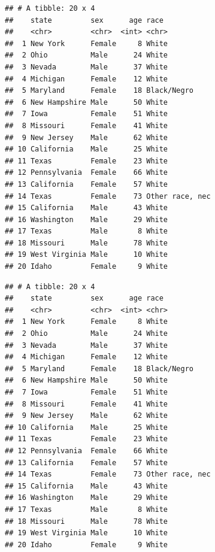 \documentclass[]{book}
\newenvironment{Shaded}{\begin{snugshade}}{\end{snugshade}}
\newcommand{\DecValTok}[1]{\textcolor[rgb]{0.00,0.00,0.81}{#1}}
\newcommand{\KeywordTok}[1]{\textcolor[rgb]{0.13,0.29,0.53}{\textbf{#1}}}
\newcommand{\NormalTok}[1]{#1}
\newcommand{\OperatorTok}[1]{\textcolor[rgb]{0.81,0.36,0.00}{\textbf{#1}}}
\newcommand{\StringTok}[1]{\textcolor[rgb]{0.31,0.60,0.02}{#1}}
\theoremstyle{definition}
\theoremstyle{definition}
\theoremstyle{definition}
\theoremstyle{remark}
\begin{document}
\begin{verbatim}
## # A tibble: 20 x 4
##    state         sex      age race           
##    <chr>         <chr>  <int> <chr>          
##  1 New York      Female     8 White          
##  2 Ohio          Male      24 White          
##  3 Nevada        Male      37 White          
##  4 Michigan      Female    12 White          
##  5 Maryland      Female    18 Black/Negro    
##  6 New Hampshire Male      50 White          
##  7 Iowa          Female    51 White          
##  8 Missouri      Female    41 White          
##  9 New Jersey    Male      62 White          
## 10 California    Male      25 White          
## 11 Texas         Female    23 White          
## 12 Pennsylvania  Female    66 White          
## 13 California    Female    57 White          
## 14 Texas         Female    73 Other race, nec
## 15 California    Male      43 White          
## 16 Washington    Male      29 White          
## 17 Texas         Male       8 White          
## 18 Missouri      Male      78 White          
## 19 West Virginia Male      10 White          
## 20 Idaho         Female     9 White
\end{verbatim}

\begin{Shaded}
\end{Shaded}

\begin{verbatim}
## # A tibble: 20 x 4
##    state         sex      age race           
##    <chr>         <chr>  <int> <chr>          
##  1 New York      Female     8 White          
##  2 Ohio          Male      24 White          
##  3 Nevada        Male      37 White          
##  4 Michigan      Female    12 White          
##  5 Maryland      Female    18 Black/Negro    
##  6 New Hampshire Male      50 White          
##  7 Iowa          Female    51 White          
##  8 Missouri      Female    41 White          
##  9 New Jersey    Male      62 White          
## 10 California    Male      25 White          
## 11 Texas         Female    23 White          
## 12 Pennsylvania  Female    66 White          
## 13 California    Female    57 White          
## 14 Texas         Female    73 Other race, nec
## 15 California    Male      43 White          
## 16 Washington    Male      29 White          
## 17 Texas         Male       8 White          
## 18 Missouri      Male      78 White          
## 19 West Virginia Male      10 White          
## 20 Idaho         Female     9 White
\end{verbatim}
\end{document}
